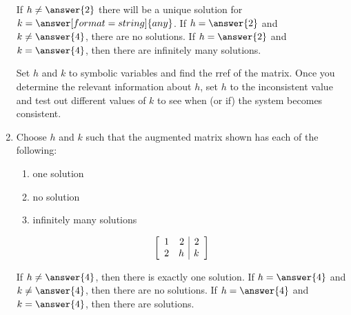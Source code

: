 \documentclass{ximera}
\begin{document}
\begin{exercise}
\begin{enumerate}
        If $h\neq \answer{2}$ there will be a unique solution for $k=\answer[format=string]{any}$. If $h=\answer{2}$ and $k\neq \answer{4}$, there are no solutions. If $h=\answer{2}$ and $k=\answer{4}$, then there are infinitely many solutions.

        \begin{hint}
        
            Set $h$ and $k$ to symbolic variables and find the rref of the matrix. Once you determine the relevant information about $h$, set $h$ to the inconsistent value and test out different values of $k$ to see when (or if) the system becomes consistent.

        \end{hint}
        
        \item Choose $h$ and $k$ such that the augmented matrix shown has each of the following:
        \begin{enumerate}
          \item one solution
          \item no solution
          \item infinitely many solutions
        \end{enumerate}
        \begin{equation*}
          \startmat{rr|r}
            1 & 2 & 2 \\
            2 & h & k
          \stopmat
        \end{equation*}
        
        If $h\neq \answer{4}$, then there is exactly one solution. If $h=\answer{4}$ and $k\neq \answer{4}$, then there are no solutions. If $h=\answer{4}$ and $k=\answer{4}$, then there are  solutions.
        
    \end{enumerate}
    

\end{exercise}
\end{document}
